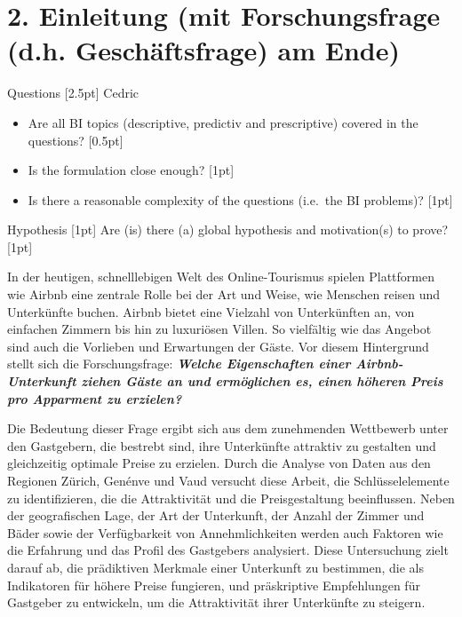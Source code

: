\documentclass[
  journal,
]{IEEEtran}%
\begin{document}
\hypertarget{einleitung-mit-forschungsfrage-d.h.-geschuxe4ftsfrage-am-ende}{%
\section{2. Einleitung (mit Forschungsfrage (d.h. Geschäftsfrage) am
Ende)}\label{einleitung-mit-forschungsfrage-d.h.-geschuxe4ftsfrage-am-ende}}

Questions {[}2.5pt{]} Cedric

\begin{itemize}
\item
  Are all BI topics (descriptive, predictiv and prescriptive) covered in
  the questions? {[}0.5pt{]}
\item
  Is the formulation close enough? {[}1pt{]}
\item
  Is there a reasonable complexity of the questions (i.e.~the BI
  problems)? {[}1pt{]}
\end{itemize}

Hypothesis {[}1pt{]} Are (is) there (a) global hypothesis and
motivation(s) to prove? {[}1pt{]}

\hfill\break
In der heutigen, schnelllebigen Welt des Online-Tourismus spielen
Plattformen wie Airbnb eine zentrale Rolle bei der Art und Weise, wie
Menschen reisen und Unterkünfte buchen. Airbnb bietet eine Vielzahl von
Unterkünften an, von einfachen Zimmern bis hin zu luxuriösen Villen. So
vielfältig wie das Angebot sind auch die Vorlieben und Erwartungen der
Gäste. Vor diesem Hintergrund stellt sich die Forschungsfrage:
\textbf{\emph{Welche Eigenschaften einer Airbnb-Unterkunft ziehen Gäste
an und ermöglichen es, einen höheren Preis pro Apparment zu erzielen?}}

Die Bedeutung dieser Frage ergibt sich aus dem zunehmenden Wettbewerb
unter den Gastgebern, die bestrebt sind, ihre Unterkünfte attraktiv zu
gestalten und gleichzeitig optimale Preise zu erzielen. Durch die
Analyse von Daten aus den Regionen Zürich, Genénve und Vaud versucht
diese Arbeit, die Schlüsselelemente zu identifizieren, die die
Attraktivität und die Preisgestaltung beeinflussen. Neben der
geografischen Lage, der Art der Unterkunft, der Anzahl der Zimmer und
Bäder sowie der Verfügbarkeit von Annehmlichkeiten werden auch Faktoren
wie die Erfahrung und das Profil des Gastgebers analysiert. Diese
Untersuchung zielt darauf ab, die prädiktiven Merkmale einer Unterkunft
zu bestimmen, die als Indikatoren für höhere Preise fungieren, und
präskriptive Empfehlungen für Gastgeber zu entwickeln, um die
Attraktivität ihrer Unterkünfte zu steigern.
\end{document}

